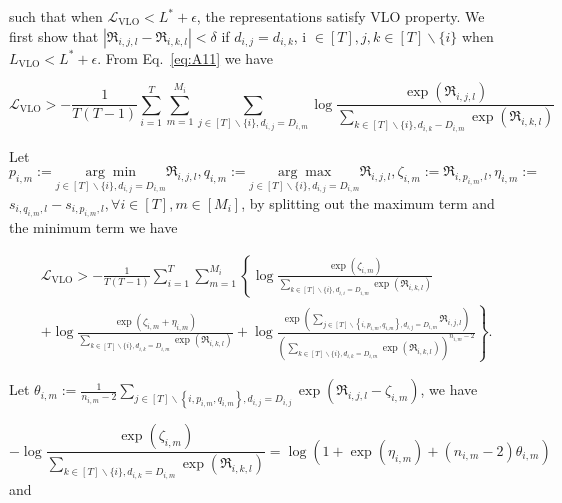 such that when $\mathcal{L}_{\mathrm{VLO}}<L^*+\epsilon$, the representations satisfy VLO property.
We first show that $\left|\mathfrak{R}_{i, j,l}-\mathfrak{R}_{i, k,l}\right|<\delta$ if $d_{i, j}=d_{i, k}$, i $\in[T], j, k \in[T] \backslash\{i\}$ when $L_{\mathrm{VLO}}<L^*+\epsilon$. From Eq.~\eqref{eq:A11} we have

\begin{equation} \label{eq:A18}
\mathcal{L}_{\operatorname{VLO}}>-\frac{1}{T(T-1)} \sum\limits_{i=1}^{T} \sum\limits_{m=1}^{M_i} \sum\limits_{j \in[T] \backslash\{i\}, d_{i, j}=D_{i, m}} \log \frac{\exp \left(\mathfrak{R}_{i, j,l}\right)}{\sum\limits_{k \in[T] \backslash\{i\}, d_{i, k}-D_{i,m}} \exp \left(\mathfrak{R}_{i, k,l}\right)}
\end{equation}

Let $p_{i, m}:=\underset{j \in[T] \backslash\{i\}, d_{i, j}=D_{i, m}}{\arg \min } \mathfrak{R}_{i, j,l}, q_{i, m}:=\underset{j \in[T] \backslash\{i\}, d_{i, j}=D_{i, m}}{\arg \max } \mathfrak{R}_{i, j,l}, \zeta_{i, m}:=\mathfrak{R}_{i, p_{i, m},l}, \eta_{i, m}:=$ $s_{i, q_{i,m},l}-s_{i, p_{i, m},l}, \forall i \in[T], m \in\left[M_i\right]$, by splitting out the maximum term and the minimum term we have

\begin{equation} \label{eq:A19}
\begin{aligned}
& \mathcal{L}_\mathrm{VLO}>-\frac{1}{T(T-1)} \sum\limits_{i=1}^{T} \sum\limits_{m=1}^{M_i}\left\{\log \frac{\exp \left(\zeta_{i, m}\right)}{\sum\limits_{k \in[T] \backslash \{i\}, d_{i, i}=D_{i, m}} \exp \left(\mathfrak{R}_{i, k,l}\right)}\right. \\
& \left.+\log \frac{\exp \left(\zeta_{i, m}+\eta_{i, m}\right)}{\sum\limits_{k \in[T] \backslash \{i\}, d_{i, k}=D_{i, m}} \exp \left(\mathfrak{R}_{i, k,l}\right)}+\log \frac{\exp \left(\sum\limits_{j \in [T] \backslash\left\{i, p_{i,m}, q_{i, m}\right\}, d_{i, j}=D_{i, m}} \mathfrak{R}_{i, j,l}\right)}{\left(\sum\limits_{k \in [T] \backslash\{i\}, d_{i, k}=D_{i, m}} \exp \left(\mathfrak{R}_{i, k,l}\right)\right)^{n_{i,m}-2}}\right\} .
\end{aligned}
\end{equation}


Let $\theta_{i, m}:=\frac{1}{n_{i, m}-2} \sum\limits_{j \in[T] \backslash\left\{i, p_{i,m}, q_{i, m}\right\},d_{i, j}=D_{i, j}} \exp \left(\mathfrak{R}_{i, j,l}-\zeta_{i, m}\right)$, we have

\begin{equation}\label{eq:A20}
    -\log \frac{\exp \left(\zeta_{i, m}\right)}{\sum\limits_{k \in[T] \backslash \{i\}, d_{i, k}=D_{i, m}} \exp \left(\mathfrak{R}_{i, k,l}\right)}=\log \left(1+\exp \left(\eta_{i, m}\right)+\left(n_{i, m}-2\right) \theta_{i, m}\right)
\end{equation}
and

